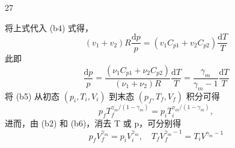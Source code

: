 \begin{solution}{27}
\begin{subsolution}
\begin{subproblem}[证法（b）]
\begin{equation}
      \end{equation}
      将上式代入 (b4) 式得，
      \begin{equation}
        (v_{1} + v_{2}) R \frac{\mathrm{d} p}{p} = (v_{1} C_{p 1} + v_{2} C_{p 2}) \frac{\mathrm{d} T}{T}
      \end{equation}
      此即
      \begin{equation}
        \frac{\mathrm{d} p}{p} = \frac{(\nu_{1} C_{p 1} + \nu_{2} C_{p 2})}{(\nu_{1} + \nu_{2}) R} \frac{\mathrm{d} T}{T} = \frac{\gamma_{m}}{\gamma_{m} - 1} \frac{\mathrm{d} T}{T}
        \label{eq:b5}
      \end{equation}
      将 (b5) 从初态 $(p_{i},T_{i},V_{i})$ 到末态 $(p_{f},T_{f},V_{f})$ 积分可得
      \begin{equation}
        p_{f} T_{f}^{\gamma_{m} / (1 - \gamma_{m})} = p_{i} T_{i}^{\gamma_{m} / (1 - \gamma_{m})},
        \label{eq:b6}
      \end{equation}
      进而，由 (b2) 和 (b6)，消去 T 或 p，可分别得
      \begin{equation}
        p_{f} V_{f}^{\gamma_{m}} = p_{i} V_{i}^{\gamma_{m}}, \quad T_{f} V_{f}^{\gamma_{m} - 1} = T_{i} V^{\gamma_{m} - 1}
        \label{eq:b7}
      \end{equation}
    \end{subproblem}
  \end{subsolution}
\end{solution}